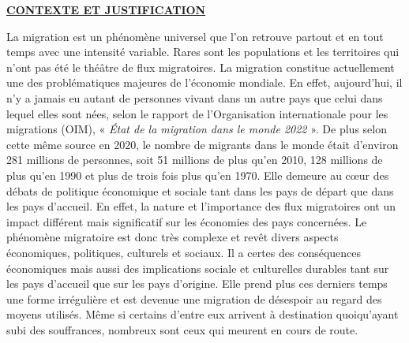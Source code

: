 \documentclass[
  letterpaper,
  DIV=11,
  numbers=noendperiod]{scrartcl}
\begin{document}
\ul{\textbf{CONTEXTE ET JUSTIFICATION}}

La migration est un phénomène universel que l'on retrouve partout et en
tout temps avec une intensité variable. Rares sont les populations et
les territoires qui n'ont pas été le théâtre de flux migratoires. La
migration constitue actuellement une des problématiques majeures de
l'économie mondiale. En effet, aujourd'hui, il n'y a jamais eu autant de
personnes vivant dans un autre pays que celui dans lequel elles sont
nées, selon le rapport de l'Organisation internationale pour les
migrations (OIM), « \emph{État de la migration dans le monde 2022} ». De
plus selon cette même source en 2020, le nombre de migrants dans le
monde était d'environ 281 millions de personnes, soit 51 millions de
plus qu'en 2010, 128 millions de plus qu'en 1990 et plus de trois fois
plus qu'en 1970. Elle demeure au cœur des débats de politique économique
et sociale tant dans les pays de départ que dans les pays d'accueil. En
effet, la nature et l'importance des flux migratoires ont un impact
différent mais significatif sur les économies des pays concernées. Le
phénomène migratoire est donc très complexe et revêt divers aspects
économiques, politiques, culturels et sociaux. Il a certes des
conséquences économiques mais aussi des implications sociale et
culturelles durables tant sur les pays d'accueil que sur les pays
d'origine. Elle prend plus ces derniers temps une forme irrégulière et
est devenue une migration de désespoir au regard des moyens utilisés.
Même si certains d'entre eux arrivent à destination quoiqu'ayant subi
des souffrances, nombreux sont ceux qui meurent en cours de route.
\end{document}
